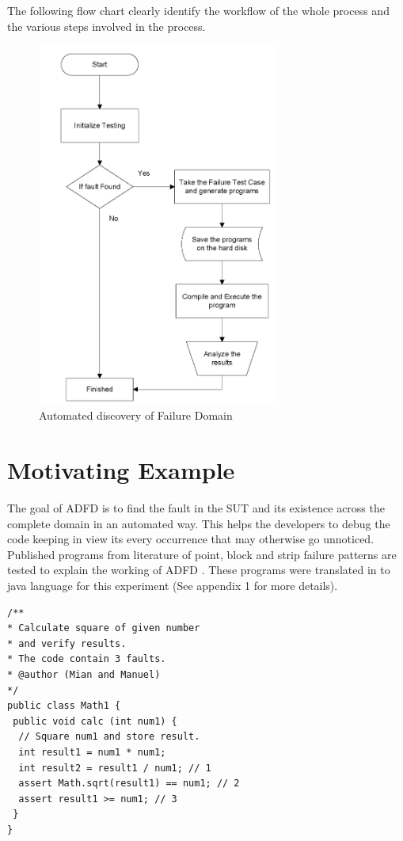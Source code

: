 \documentclass{acm_proc_article-sp}
\begin{document}
The following flow chart clearly identify the workflow of the whole process and the various steps involved in the process.

\begin{figure}[p]
\centering
\includegraphics[width=8cm,height=12cm]{automatedFail.png}
\caption{Automated discovery of Failure Domain}
\label{fig:autofail}
\end{figure}


\section{Motivating Example}\label{sec:example}
The goal of ADFD is to find the fault in the SUT and its existence across the complete domain in an automated way. This helps the developers to debug the code keeping in view its every occurrence that may otherwise go unnoticed.
Published programs from literature \cite{Chen2003}\cite{Chan1996}\cite{Chen2004} of point, block and strip failure patterns are tested to explain the working of ADFD . These programs were translated in to java language for this experiment (See appendix 1 for more details). \\

\begin{lstlisting}
/** 
* Calculate square of given number 
* and verify results. 
* The code contain 3 faults.
* @author (Mian and Manuel)
*/
public class Math1 {
 public void calc (int num1) {
  // Square num1 and store result. 
  int result1 = num1 * num1;
  int result2 = result1 / num1; // 1
  assert Math.sqrt(result1) == num1; // 2
  assert result1 >= num1; // 3
 } 
}
\end{lstlisting}
\end{document}
